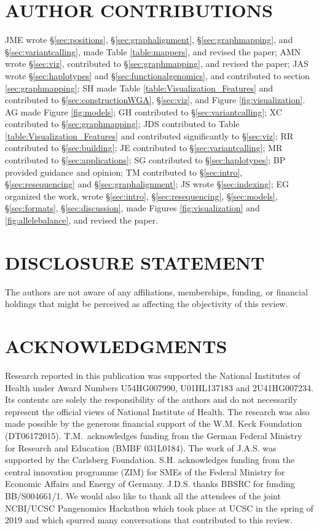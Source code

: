 \section*{AUTHOR CONTRIBUTIONS}

JME wrote \S \ref{sec:positions}, \S \ref{sec:graphalignment}, \S \ref{sec:graphmapping}, and \S \ref{sec:variantcalling}, made Table \ref{table:mappers}, and revised the paper;
AMN wrote \S \ref{sec:viz}, contributed to \S \ref{sec:graphmapping}, and revised the paper;
JAS wrote \S \ref{sec:haplotypes} and \S \ref{sec:functionalgenomics}, and contributed to section \ref{sec:graphmapping};
SH made Table \ref{table:Visualization_Features} and contributed to \S \ref{sec:constructionWGA}, \S \ref{sec:viz}, and Figure \ref{fig:visualization}.
AG made Figure \ref{fig:models};
GH contributed to \S \ref{sec:variantcalling};
XC contributed to \S \ref{sec:graphmapping};
JDS contributed to Table \ref{table:Visualization_Features} and contributed significantly to \S \ref{sec:viz};
RR contributed to \S \ref{sec:building};
JE contributed to \S \ref{sec:variantcalling};
MR contributed to \S \ref{sec:applications};
SG contributed to \S \ref{sec:haplotypes};
BP provided guidance and opinion;
TM contributed to \S \ref{sec:intro}, \S \ref{sec:resequencing} and \S \ref{sec:graphalignment};
JS wrote \S \ref{sec:indexing};
EG organized the work, wrote \S \ref{sec:intro}, \S \ref{sec:resequencing}, \S \ref{sec:models}, \S \ref{sec:formats}, \S \ref{sec:discussion}, made Figures \ref{fig:visualization} and \ref{fig:allelebalance}, and revised the paper.


\section*{DISCLOSURE STATEMENT}

The authors are not aware of any affiliations, memberships, funding, or financial holdings that
might be perceived as affecting the objectivity of this review. 


\section*{ACKNOWLEDGMENTS}

Research reported in this publication was supported the National Institutes of Health under Award Numbers U54HG007990, U01HL137183 and 2U41HG007234.
Its contents are solely the responsibility of the authors and do not necessarily represent the official views of National Institute of Health.
The research was also made possible by the generous financial support of the W.M. Keck Foundation (DT06172015).
T.M.\ acknowledges funding from the German Federal Ministry for Research and Education (BMBF 031L0184).
The work of J.A.S. was supported by the Carlsberg Foundation.
S.H. acknowledges funding from the central innovation programme (ZIM) for SMEs of the Federal Ministry for Economic Affairs and Energy of Germany.
J.D.S. thanks BBSRC for funding BB/S004661/1.
We would also like to thank all the attendees of the joint NCBI/UCSC Pangenomics Hackathon which took place at UCSC in the spring of 2019 and which spurred many conversations that contributed to this review.

